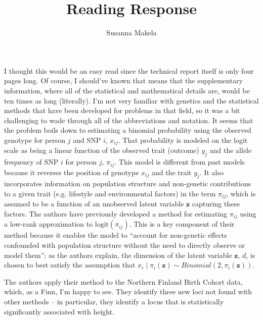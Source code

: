 \documentclass[10pt,a4paper]{article}
\author{Susanna Makela}
\title{Reading Response}
\begin{document}
\maketitle

I thought this would be an easy read since the technical report itself is only four pages long. Of course, I should've known that means that the supplementary information, where all of the statistical and mathematical details are, would be ten times as long (literally). I'm not very familiar with genetics and the statistical methods that have been developed for problems in that field, so it was a bit challenging to wade through all of the abbreviations and notation. It seems that the problem boils down to estimating a binomial probability using the observed genotype for person $j$ and SNP $i$, $x_{ij}$. That probability is modeled on the logit scale as being a linear function of the observed trait (outcome) $y_j$ and the allele frequency of SNP $i$ for person $j$, $\pi_{ij}$. This model is different from past models because it reverses the position of genotype $x_{ij}$ and the trait $y_j$. It also incorporates information on population structure and non-genetic contributions to a given trait (e.g. lifestyle and environmental factors) in the term $\pi_{ij}$, which is assumed to be a function of an unobserved latent variable $\mathbf{z}$ capturing these factors. The authors have previously developed a method for estimating $\pi_{ij}$ using a low-rank approximation to $\text{logit}(\pi_{ij})$. This is a key component of their method because it enables the model to ``account for non-genetic effects confounded with population structure without the need to directly observe or model them''; as the authors explain, the dimension of the latent variable $\mathbf{z}$, $d$, is chosen to best satisfy the assumption that $x_i \mid \pi_i(\mathbf{z})\sim Binomial(2, \pi_i(\mathbf{z}))$.

The authors apply their method to the Northern Finland Birth Cohort data, which, as a Finn, I'm happy to see. They identify three new loci not found with other methods -- in particular, they identify a locus that is statistically significantly associated with height.
\end{document}
